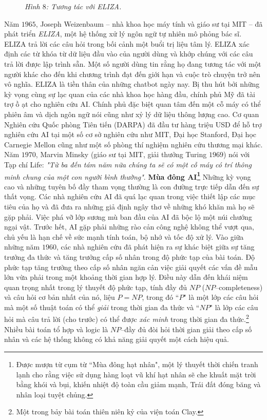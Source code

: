 \begin{multicols}{2}
\begin{figure}[H]
		\caption{\small\textit{\color{cackithi}Hình $8$: Tương tác với ELIZA.}}
		\vspace*{-10pt}
	\end{figure}
	Năm $1965$, Joseph Weizenbaum -- nhà khoa học máy tính và giáo sư tại MIT -- đã phát triển \textit{ELIZA}, một hệ thống xử lý ngôn ngữ tự nhiên mô phỏng bác sĩ. ELIZA trả lời các câu hỏi trong bối cảnh một buổi trị liệu tâm lý. ELIZA xác định các từ khóa từ dữ liệu đầu vào của người dùng và khớp chúng với các câu trả lời được lập trình sẵn. Một số người dùng tin rằng họ đang tương tác với một người khác cho đến khi chương trình đạt đến giới hạn và cuộc trò chuyện trở nên vô nghĩa. ELIZA là tiền thân của những chatbot ngày nay.
	\vskip 0.1cm
	Bị thu hút bởi những kỳ vọng cùng sự lạc quan của các nhà khoa học hàng đầu, chính phủ Mỹ đã tài trợ ồ ạt cho nghiên cứu AI. Chính phủ đặc biệt quan tâm đến một cỗ máy có thể phiên âm và dịch ngôn ngữ nói cũng như xỷ lý dữ liệu thông lượng cao. Cơ quan Nghiên cứu Quốc phòng Tiên tiến (DARPA) đã đầu tư hàng triệu USD để hỗ trợ nghiên cứu AI tại một số cơ sở nghiên cứu như MIT, Đại học Stanford, Đại học Carnegie Mellon cũng như một số phòng thí nghiệm nghiên cứu thương mại khác. Năm $1970$, Marvin Minsky (giáo sư tại MIT, giải thưởng Turing $1969$) nói với Tạp chí Life: \textit{"Từ ba đến tám năm nữa chúng ta sẽ có một cỗ máy có trí thông minh chung của một con người bình thường"}. 
	\vskip 0.1cm
	\textbf{\color{cackithi}Mùa đông AI\footnote{\color{cackithi}Được mượn từ cụm từ ``Mùa đông hạt nhân", một lý thuyết thời chiến tranh lạnh cho rằng việc sử dụng hàng loạt vũ khí hạt nhân sẽ che khuất mặt trời bằng khói và bụi, khiến nhiệt độ toàn cầu giảm mạnh, Trái đất đóng băng và nhân loại tuyệt chủng.}}
	\vskip 0.1cm
	Những kỳ vọng cao và những tuyên bố đầy tham vọng thường là con đường trực tiếp dẫn đến sự thất vọng. Các nhà nghiên cứu AI đã quá lạc quan trong việc thiết lập các mục tiêu của họ và đã đưa ra những giả định ngây thơ về những khó khăn mà họ sẽ gặp phải. Việc phá vỡ lớp sương mù ban đầu của AI đã bộc lộ một núi chướng ngại vật. 
	\vskip 0.1cm
	Trước hết, AI gặp phải những rào cản công nghệ không thể vượt qua, chủ yếu là hạn chế về sức mạnh tính toán, bộ nhớ và tốc độ xử lý. Vào giữa những năm $1960$, các nhà nghiên cứu đã phát hiện ra sự khác biệt giữa sự tăng trưởng đa thức và tăng trưởng cấp số nhân trong độ phức tạp của bài toán. Độ phức tạp tăng trưởng theo cấp số nhân ngăn cản việc giải quyết các vấn đề mẫu lớn vừa phải trong một khoảng thời gian hợp lý. Điều này dẫn đến khái niệm quan trọng nhất trong lý thuyết độ phức tạp, tính đầy đủ $NP$ ($NP$--completeness) và câu hỏi cơ bản nhất của nó, liệu $P = NP$, trong đó ``$P$" là một lớp các câu hỏi mà một số thuật toán có thể \textit{giải} trong thời gian đa thức và ``$NP$" là lớp các câu hỏi mà câu trả lời (cho trước) có thể được \textit{xác minh} trong thời gian đa thức.\footnote{\color{cackithi}Một trong bảy bài toán thiên niên kỷ của viện toán Clay.} Nhiều bài toán tổ hợp và logic là $NP$--đầy đủ đòi hỏi thời gian giải theo cấp số nhân và các hệ thống không có khả năng giải quyết một cách hiệu quả.

\end{multicols}
